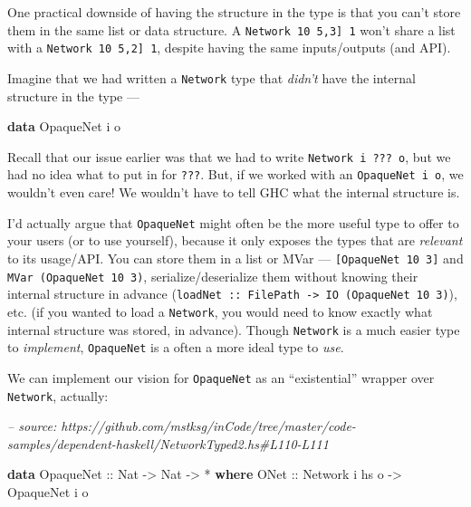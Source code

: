 \documentclass[]{article}
\newenvironment{Shaded}{}{}
\newcommand{\CommentTok}[1]{\textcolor[rgb]{0.38,0.63,0.69}{\textit{#1}}}
\newcommand{\DataTypeTok}[1]{\textcolor[rgb]{0.56,0.13,0.00}{#1}}
\newcommand{\FunctionTok}[1]{\textcolor[rgb]{0.02,0.16,0.49}{#1}}
\newcommand{\KeywordTok}[1]{\textcolor[rgb]{0.00,0.44,0.13}{\textbf{#1}}}
\newcommand{\NormalTok}[1]{#1}
\newcommand{\OtherTok}[1]{\textcolor[rgb]{0.00,0.44,0.13}{#1}}
\begin{document}
One practical downside of having the structure in the type is that you can't
store them in the same list or data structure. A
\texttt{Network\ 10\ \textquotesingle{}{[}5,3{]}\ 1} won't share a list with a
\texttt{Network\ 10\ \textquotesingle{}{[}5,2{]}\ 1}, despite having the same
inputs/outputs (and API).

Imagine that we had written a \texttt{Network} type that \emph{didn't} have the
internal structure in the type ---

\begin{Shaded}
\begin{Highlighting}[]
\KeywordTok{data} \DataTypeTok{OpaqueNet}\NormalTok{ i o}
\end{Highlighting}
\end{Shaded}

Recall that our issue earlier was that we had to write
\texttt{Network\ i\ ???\ o}, but we had no idea what to put in for \texttt{???}.
But, if we worked with an \texttt{OpaqueNet\ i\ o}, we wouldn't even care! We
wouldn't have to tell GHC what the internal structure is.

I'd actually argue that \texttt{OpaqueNet} might often be the more useful type
to offer to your users (or to use yourself), because it only exposes the types
that are \emph{relevant} to its usage/API. You can store them in a list or MVar
--- \texttt{{[}OpaqueNet\ 10\ 3{]}} and \texttt{MVar\ (OpaqueNet\ 10\ 3)},
serialize/deserialize them without knowing their internal structure in advance
(\texttt{loadNet\ ::\ FilePath\ -\textgreater{}\ IO\ (OpaqueNet\ 10\ 3)}), etc.
(if you wanted to load a \texttt{Network}, you would need to know exactly what
internal structure was stored, in advance). Though \texttt{Network} is a much
easier type to \emph{implement}, \texttt{OpaqueNet} is a often a more ideal type
to \emph{use}.

We can implement our vision for \texttt{OpaqueNet} as an ``existential'' wrapper
over \texttt{Network}, actually:

\begin{Shaded}
\begin{Highlighting}[]
\CommentTok{-- source: https://github.com/mstksg/inCode/tree/master/code-samples/dependent-haskell/NetworkTyped2.hs#L110-L111}

\KeywordTok{data} \DataTypeTok{OpaqueNet}\OtherTok{ ::} \DataTypeTok{Nat} \OtherTok{->} \DataTypeTok{Nat} \OtherTok{->} \FunctionTok{*} \KeywordTok{where}
    \DataTypeTok{ONet}\OtherTok{ ::} \DataTypeTok{Network}\NormalTok{ i hs o }\OtherTok{->} \DataTypeTok{OpaqueNet}\NormalTok{ i o}
\end{Highlighting}
\end{Shaded}
\end{document}
